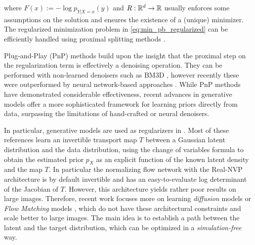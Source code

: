 \documentclass{article} %
\theoremstyle{definition}
\begin{document}
where $F(x):= -\log p_{Y|X=x}(y)$ and $R:\mathbb{R}^d \to \mathbb{R}$ usually enforces some assumptions on the solution and ensures the existence of a (unique) minimizer.
The regularized minimization problem in \eqref{eq:min_pb_regularized} can be efficiently handled using proximal splitting methods \citep{boyd2011distributed}. 

Plug-and-Play (PnP) \citep{venkatakrishnan13pnp} methods build upon the insight that the proximal step on the regularization term is effectively a denoising operation.
They can be performed with non-learned denoisers such as BM3D \citep{chan2016plug}, however recently these were outperformed by neural network-based approaches
\citep{meinhardt17learnprox,zhang2017beyond, zhang2021plug}.
While PnP methods have demonstrated considerable effectiveness, recent advances in generative models offer a more sophisticated framework for learning priors directly from data, surpassing the limitations of hand-crafted or neural denoisers. 

In particular, generative models are used as regularizers in \cite{bora2017compressed, pmlr-v119-asim20a, Altekruger_2023, Wei_2022}. 
Most of these references learn an invertible transport map $T$ between a Gaussian latent distribution and the data distribution, using the change of variables formula to obtain the estimated prior $p_X$ as an explicit function of the known latent density and the map $T$.
In particular the normalizing flow network with the 
Real-NVP \citep{dinh2017density} architecture is by default invertible and has an easy-to-evaluate log determinant of the Jacobian of $T$. 
However, this architecture yields rather poor results on large images. 
Therefore, recent work \citep{ben2024dflow, zhang2024flow, pokle2024trainingfree, chung2023diffusion, song2023pseudoinverse} focuses more on learning \emph{diffusion} models \citep{song2021scorebased,ho2020,pmlr-v37-sohl-dickstein15} or \emph{Flow Matching} models \citep{lipman2023flow,liu2023flow}, which do not have these architectural constraints and scale better to large images. The main idea is to establish a path between the latent and the target distribution, which can be optimized in a \emph{simulation-free} way.
\end{document}
